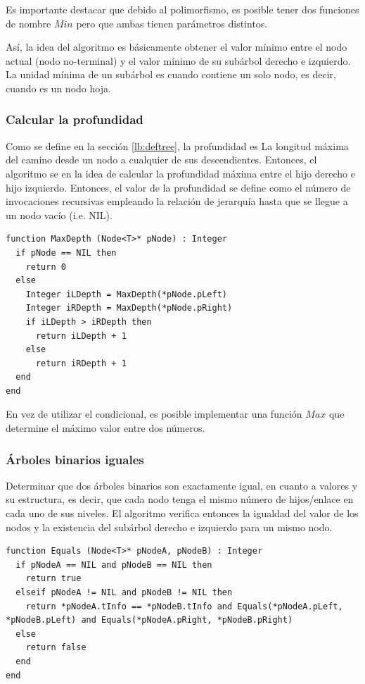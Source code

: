 Es importante destacar que debido al polimorfismo, es posible tener dos funciones de nombre $Min$ pero que ambas tienen parámetros distintos.

Así, la idea del algoritmo es básicamente obtener el valor mínimo entre el nodo actual (nodo no-terminal) y el valor mínimo de su subárbol derecho e izquierdo. La unidad mínima de un subárbol es cuando contiene un solo nodo, es decir, cuando es un nodo hoja.

\subsubsection{Calcular la profundidad}

Como se define en la sección \ref{lb:deftree}, la profundidad es La longitud máxima del camino desde un nodo a cualquier de sus descendientes. Entonces, el algoritmo se en la idea de calcular la profundidad máxima entre el hijo derecho e hijo izquierdo. Entonces, el valor de la profundidad se define como el número de invocaciones recursivas empleando la relación de jerarquía hasta que se llegue a un nodo vacío (i.e. NIL).

\begin{lstlisting}[upquote=true, language=pseudo]
function MaxDepth (Node<T>* pNode) : Integer
  if pNode == NIL then
    return 0
  else
    Integer iLDepth = MaxDepth(*pNode.pLeft)
    Integer iRDepth = MaxDepth(*pNode.pRight)
    if iLDepth > iRDepth then
      return iLDepth + 1
    else
      return iRDepth + 1
  end
end
\end{lstlisting}

En vez de utilizar el condicional, es posible implementar una función $Max$ que determine el máximo valor entre dos números.

\subsubsection{Árboles binarios iguales}

Determinar que dos árboles binarios son exactamente igual, en cuanto a valores y su estructura, es decir, que cada nodo tenga el mismo número de hijos/enlace en cada uno de sus niveles. El algoritmo verifica entonces la igualdad del valor de los nodos y la existencia del subárbol derecho e izquierdo para un mismo nodo.

\begin{lstlisting}[upquote=true, language=pseudo]
function Equals (Node<T>* pNodeA, pNodeB) : Integer
  if pNodeA == NIL and pNodeB == NIL then
    return true
  elseif pNodeA != NIL and pNodeB != NIL then
    return *pNodeA.tInfo == *pNodeB.tInfo and Equals(*pNodeA.pLeft, *pNodeB.pLeft) and Equals(*pNodeA.pRight, *pNodeB.pRight)
  else
    return false
  end
end
\end{lstlisting}


